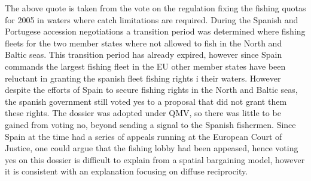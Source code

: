 The above quote is taken from the vote on the regulation fixing the fishing quotas for 2005 in waters where catch limitations are required.  During the Spanish and Portugese accession negotiations a transition period was determined where fishing fleets for the two member states where not allowed to fish in the North and Baltic seas. This transition period has already expired, however since Spain commands the largest fishing fleet in the EU other member states have been reluctant in granting the spanish fleet fishing rights i their waters. However despite the efforts of Spain to secure fishing rights in the North and Baltic seas, the spanish government still voted yes to a proposal that did not grant them these rights. The dossier was adopted under QMV, so there was little to be gained from voting no, beyond sending a signal to the Spanish fishermen. Since Spain at the time had a series of appeals running at the European Court of Justice, one could argue that the fishing lobby had been appeased, hence voting yes on this dossier is difficult to explain from a spatial bargaining model, however it  is consistent with an explanation focusing on diffuse reciprocity. 

